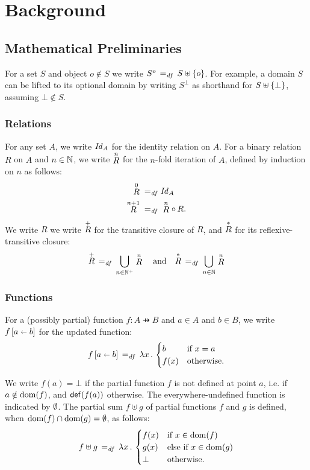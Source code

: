 \documentclass[11pt]{report}
\begin{document}
\chapter{Background}

\section{Mathematical Preliminaries}

For a set $S$ and object $o \notin S$ we write $S^o \eqdef S \uplus \set{o}$. For example, a domain $S$ can be lifted to its optional domain by writing $S^\bot$ as shorthand for $S \uplus \set{\bot}$, assuming $\bot \notin S$. 

\subsection{Relations}
\label{sec:relations}

For any set $A$, we write $\ident{A}$ for the identity relation on $A$. For a binary relation $R$ on $A$ and $n \in \setnaturals$, we write $\relexp{R}{n}$ for the $n$-fold iteration of $A$, defined by induction on $n$ as follows: \begin{align*} \relexp{R}{0} \eqdef &\ident{A} \\ 
\relexp{R}{n+1} \eqdef & \relexp{R}{n} \rcomp R.\end{align*} We write $R$ we write $\tcl{R}$ for the transitive closure of $R$, and $\rtcl{R}$ for its reflexive-transitive closure: \begin{align*}
    \tcl{R} \eqdef \bigcup_{n \in \setpositives} \relexp{R}{n} \text{~~~and~~~}
    \rtcl{R} \eqdef \bigcup_{n \in \setnaturals} \relexp{R}{n} 
\end{align*}

\subsection{Functions}
\label{sec:functions}

For a (possibly partial) function $f : A \pfun B$ and $a \in A$ and $b \in B$, we write $\funup{f}{\ptup{a}{b}}$ for the updated function: \[ \funup{f}{\ptup{a}{b}} \eqdef \fun{x} \begin{cases}
  b & \text{if $x = a$} \\
  f(x) & \text{otherwise.}
\end{cases}\] 

We write $f(a) = \bot$ if the partial function $f$ is not defined at point $a$, i.e. if $a \notin \dom{f}$, and $\defined{f(a)}$ otherwise. The everywhere-undefined function is indicated by $\nil$. The partial sum $f \uplus g$ of partial functions $f$ and $g$ is defined, when $\dom{f} \cap \dom{g} = \nil$, as follows: \[ f \uplus g \eqdef \fun{x}\begin{cases}
    f(x) & \text{if $x \in \dom{f}$} \\
    g(x) & \text{else if $x \in \dom{g}$} \\
    \bot & \text{otherwise.}
\end{cases}\]
\end{document}
